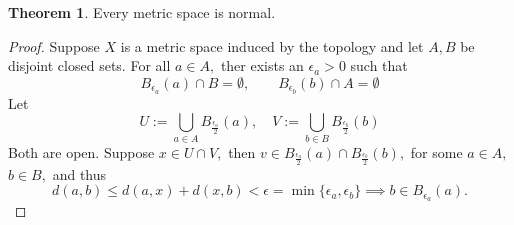 \documentclass[10pt, oneside]{article}
\theoremstyle{definition}
\newtheorem{thm}{Theorem}
\begin{document}
\begin{thm}
    Every metric space is normal.
\end{thm}
\begin{proof}
    Suppose $X$ is a metric space induced by the topology and let $A, B$ be disjoint closed sets. For all $a\in A,$ ther exists an $\epsilon_a >0$ such that 
    \[B_{\epsilon_a}(a) \cap B  = \emptyset, \qquad B_{\epsilon_b}(b) \cap A  = \emptyset\]
    Let \[U := \bigcup_{a\in A} B_{\frac{\epsilon_a}{2}}(a), \quad V := \bigcup_{b\in B} B_{\frac{\epsilon_b}{2}}(b)\] Both are open. Suppose $x\in U \cap V,$ then $v\in B_{\frac{\epsilon_a}{2}}(a) \cap B_{\frac{\epsilon_b}{2}}(b),$ for some $a\in A,$ $b\in B,$ and thus 
    \[d(a,b)\leq d(a,x) + d(x,b) < \epsilon = \min\{\epsilon_a, \epsilon_b\} \implies b \in B_{\epsilon_a}(a).\]
\end{proof}
\end{document}
